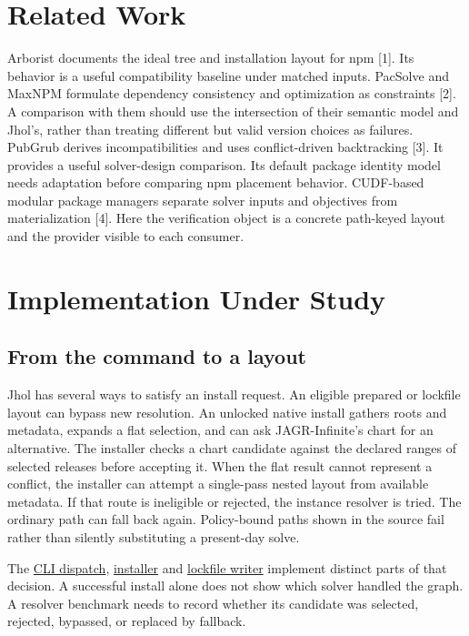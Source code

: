 \documentclass[
  11pt,
  letterpaper,
]{article}
\begin{document}
\section{Related Work}\label{related-work}

Arborist documents the ideal tree and installation layout for npm
{[}1{]}. Its behavior is a useful compatibility baseline under matched
inputs. PacSolve and MaxNPM formulate dependency consistency and
optimization as constraints {[}2{]}. A comparison with them should use
the intersection of their semantic model and Jhol's, rather than
treating different but valid version choices as failures. PubGrub
derives incompatibilities and uses conflict-driven backtracking {[}3{]}.
It provides a useful solver-design comparison. Its default package
identity model needs adaptation before comparing npm placement behavior.
CUDF-based modular package managers separate solver inputs and
objectives from materialization {[}4{]}. Here the verification object is
a concrete path-keyed layout and the provider visible to each consumer.

\section{Implementation Under Study}\label{implementation-under-study}

\subsection{From the command to a
layout}\label{from-the-command-to-a-layout}

Jhol has several ways to satisfy an install request. An eligible
prepared or lockfile layout can bypass new resolution. An unlocked
native install gathers roots and metadata, expands a flat selection, and
can ask JAGR-Infinite's chart for an alternative. The installer checks a
chart candidate against the declared ranges of selected releases before
accepting it. When the flat result cannot represent a conflict, the
installer can attempt a single-pass nested layout from available
metadata. If that route is ineligible or rejected, the instance resolver
is tried. The ordinary path can fall back again. Policy-bound paths
shown in the source fail rather than silently substituting a present-day
solve.

The \href{../../src/main.rs}{CLI dispatch},
\href{../../crates/jhol-core/src/install.rs}{installer} and
\href{../../crates/jhol-core/src/lockfile_write.rs}{lockfile writer}
implement distinct parts of that decision. A successful install alone
does not show which solver handled the graph. A resolver benchmark needs
to record whether its candidate was selected, rejected, bypassed, or
replaced by fallback.
\end{document}
